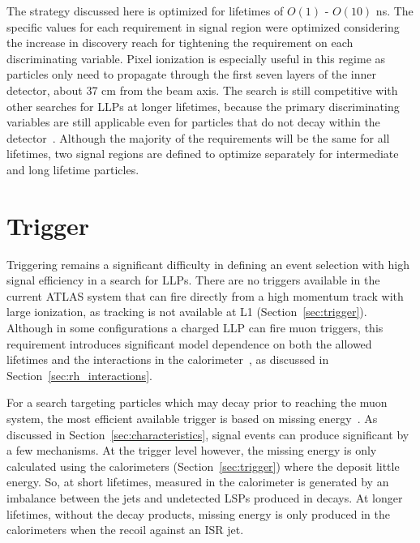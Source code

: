 The strategy discussed here is optimized for lifetimes of $O(1)$ - $O(10)$ ns. 
The specific values for each requirement in signal region were optimized considering the increase in discovery reach for tightening the requirement on each discriminating variable. 
Pixel ionization is especially useful in this regime as particles only need to propagate through the first seven layers of the inner detector, about 37 cm from the beam axis. 
The search is still competitive with other searches for \acp{LLP} at longer lifetimes, because the primary discriminating variables are still applicable even for particles that do not decay within the detector~\cite{stable2016}. 
Although the majority of the requirements will be the same for all lifetimes, two signal regions are defined to optimize separately for intermediate and long lifetime particles.



\section{Trigger}

Triggering remains a significant difficulty in defining an event selection with high signal efficiency in a search for \acp{LLP}. 
There are no triggers available in the current ATLAS system that can fire directly from a high momentum track with large ionization, as tracking is not available at L1 (Section~\ref{sec:trigger}). 
Although in some configurations a charged \ac{LLP} can fire muon triggers, this requirement introduces significant model dependence on both the allowed lifetimes and the interactions in the calorimeter~\cite{rhad_atlas}, as discussed in Section~\ref{sec:rh_interactions}.

For a search targeting particles which may decay prior to reaching the muon system, the most efficient available trigger is based on missing energy~\cite{rhad_atlas}.
As discussed in Section~\ref{sec:characteristics}, signal events can produce significant \met by a few mechanisms.
At the trigger level however, the missing energy is only calculated using the calorimeters (Section~\ref{sec:trigger}) where the \rhadrons deposit little energy.
So, at short lifetimes, \met measured in the calorimeter is generated by an imbalance between the jets and undetected \acp{LSP} produced in \rhadron decays.
At longer lifetimes, without the decay products, missing energy is only produced in the calorimeters when the \rhadrons recoil against an \ac{ISR} jet.

